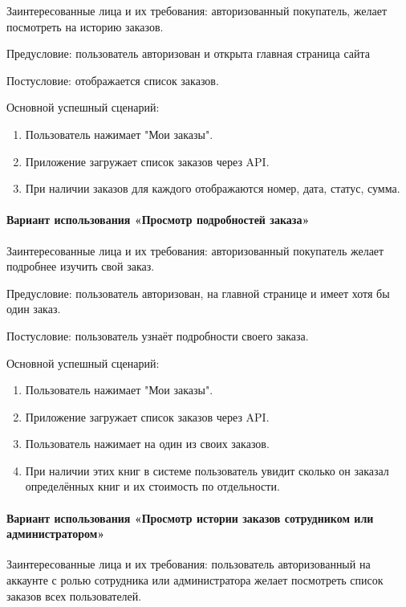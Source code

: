 Заинтересованные лица и их требования: авторизованный покупатель, желает посмотреть на историю заказов.

Предусловие: пользователь авторизован и открыта главная страница сайта

Постусловие: отображается список заказов.

Основной успешный сценарий:

\begin{enumerate}
	\item Пользователь нажимает "Мои заказы".
	\item Приложение загружает список заказов через API.
	\item При наличии заказов для каждого отображаются номер, дата, статус, сумма.
\end{enumerate}


\paragraph{Вариант использования «Просмотр подробностей заказа»}

Заинтересованные лица и их требования: авторизованный покупатель желает подробнее изучить свой заказ.

Предусловие: пользователь авторизован, на главной странице и имеет хотя бы один заказ.

Постусловие: пользователь узнаёт подробности своего заказа.

Основной успешный сценарий:

\begin{enumerate}
	\item Пользователь нажимает "Мои заказы".
	\item Приложение загружает список заказов через API.
	\item Пользователь нажимает на один из своих заказов.
	\item При наличии этих книг в системе пользователь увидит сколько он заказал определённых книг и их стоимость по отдельности.
\end{enumerate}


\paragraph{Вариант использования «Просмотр истории заказов сотрудником или администратором»}

Заинтересованные лица и их требования: пользователь авторизованный на аккаунте с ролью сотрудника или администратора желает посмотреть список заказов всех пользователей.

